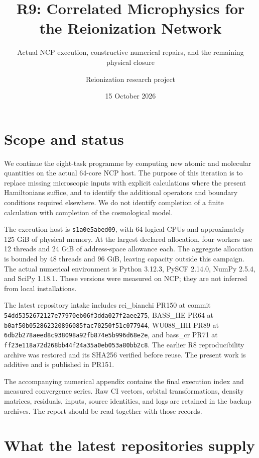 \documentclass[
  10pt,
]{article}
\title{R9: Correlated Microphysics for the Reionization Network}
\subtitle{Actual NCP execution, constructive numerical repairs, and the
remaining physical closure}
\author{Reionization research project}
\date{15 October 2026}
\begin{document}
\maketitle

{
\hypersetup{linkcolor=}
\setcounter{tocdepth}{3}
\tableofcontents
}
\hypertarget{scope-and-status}{%
\section{Scope and status}\label{scope-and-status}}

We continue the eight-task programme by computing new atomic and
molecular quantities on the actual 64-core NCP host. The purpose of this
iteration is to replace missing microscopic inputs with explicit
calculations where the present Hamiltonians suffice, and to identify the
additional operators and boundary conditions required elsewhere. We do
not identify completion of a finite calculation with completion of the
cosmological model.

The execution host is \texttt{s1a0e5abed09}, with 64 logical CPUs and
approximately 125 GiB of physical memory. At the largest declared
allocation, four workers use 12 threads and 24 GiB of address-space
allowance each. The aggregate allocation is bounded by 48 threads and 96
GiB, leaving capacity outside this campaign. The actual numerical
environment is Python 3.12.3, PySCF 2.14.0, NumPy 2.5.4, and SciPy
1.18.1. These versions were measured on NCP; they are not inferred from
local installations.

The latest repository intake includes rei\_bianchi PR150 at commit
\nolinkurl{54dd5352672127e77970eb06f3dda027f2aee275}, BASS\_HE PR64 at
\nolinkurl{b0af50b052862320896085fac70250f51c077944}, WU088\_HH PR89 at
\nolinkurl{6db2b278aeed8c938098a92fb874e5b996d68e2e}, and bass\_cr PR71
at \nolinkurl{ff23e118a72d268bb44f24a35a0eb053a80bb2c8}. The earlier R8
reproducibility archive was restored and its SHA256 verified before
reuse. The present work is additive and is published in PR151.

The accompanying numerical appendix contains the final execution index
and measured convergence series. Raw CI vectors, orbital
transformations, density matrices, residuals, inputs, source identities,
and logs are retained in the backup archives. The report should be read
together with those records.

\hypertarget{what-the-latest-repositories-supply}{%
\section{What the latest repositories
supply}\label{what-the-latest-repositories-supply}}
\end{document}

